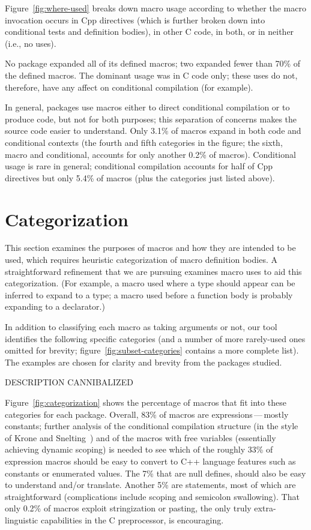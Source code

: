 \documentclass[11pt]{article}
\begin{document}
Figure~\ref{fig:where-used} breaks down macro usage according to whether
the macro invocation occurs in Cpp directives (which is further broken
down into conditional tests and definition bodies), in other C code, in
both, or in neither (i.e., no uses).

No package expanded all of its defined macros; two expanded fewer than 70\%
of the defined macros.  The dominant usage was in C code only; these uses
do not, therefore, have any affect on conditional compilation (for example).

In general, packages use macros either to direct conditional compilation or
to produce code, but not for both purposes; this separation of concerns
makes the source code easier to understand.  Only 3.1\% of macros expand in
both code and conditional contexts (the fourth and fifth categories in the
figure; the sixth, macro and conditional, accounts for only another 0.2\%
of macros). 
Conditional usage is rare in general; conditional compilation accounts for
half of Cpp directives but only 5.4\% of macros (plus the categories just
listed above).



\section{Categorization}
\label{sec:categorization}

This section examines the purposes of macros and how they are intended to
be used, which requires heuristic categorization of macro definition bodies.  A
straightforward refinement that we are pursuing examines macro uses to aid
this categorization.  (For example, a macro used where a type should appear
can be inferred to expand to a type; a macro used before a function body is
probably expanding to a declarator.)

In addition to classifying each macro as taking arguments or not, our tool
identifies the following specific categories (and a number of more
rarely-used ones omitted for brevity;
figure~\ref{fig:subset-categories} contains a more complete list).  The examples
are chosen for clarity and brevity from the packages studied.

DESCRIPTION CANNIBALIZED

Figure~\ref{fig:categorization} shows the percentage of macros that fit
into these categories for each package.  Overall, 83\% of macros are
expressions\,---\,mostly constants; further analysis of the conditional
compilation structure (in the style of Krone and Snelting~\cite{Krone94})
and of the macros with free variables (essentially achieving dynamic
scoping) is needed to see which of the roughly 33\% of expression macros
should be easy to convert to C++ language features such as constants or
enumerated values.  The 7\% that are null
defines, should also be easy to understand and/or translate.  Another 5\%
are statements, most of which are straightforward (complications include
scoping and semicolon swallowing).  That only 0.2\% of macros exploit
stringization or pasting, the only truly extra-linguistic capabilities in
the C preprocessor, is encouraging.
\end{document}
